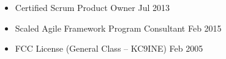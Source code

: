 \section{}

\vspace{15pt} %

\begin{itemize} \itemsep -2pt %
\item Certified Scrum Product Owner \hfill Jul 2013
\item Scaled Agile Framework Program Consultant \hfill Feb 2015
\item FCC License (General Class -- KC9INE) \hfill Feb 2005
\end{itemize}